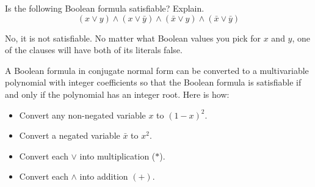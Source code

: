 \documentclass[12pt]{exam}
\begin{document}
\begin{questions}

\question[8] Is the following Boolean formula satisfiable? Explain.
$$(x \vee y) \wedge (x \vee \bar{y}) \wedge (\bar{x} \vee y) \wedge (\bar{x} \vee \bar{y})$$
\begin{solution}
No, it is not satisfiable. No matter what Boolean values you pick for $x$ and $y$, one of the clauses will have both of its literals false.  
\end{solution}
\vfill


\question[16] A Boolean formula in conjugate normal form can be converted to a multivariable polynomial with integer coefficients so that the Boolean formula is satisfiable if and only if the polynomial has an integer root.  Here is how:
\begin{itemize}
\item Convert any non-negated variable $x$ to $(1-x)^2$.
\item Convert a negated variable $\bar{x}$ to $x^2$. 
\item Convert each $\vee$ into multiplication ($*$). 
\item Convert each $\wedge$ into addition $(+)$. 
\end{itemize}
\end{questions}
\end{document}

